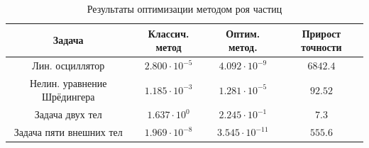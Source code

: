 \begin{table}
	\centering
	\caption{Результаты оптимизации методом роя частиц}
	\label{tab:opt_results}
	\vspace{5mm} 
	\small
	\renewcommand{\arraystretch}{1.5}
	\begin{tabular}{|c|c|c|c|}
		\hline
		\multicolumn{1}{|c|}{\textbf{Задача}} &
		\textbf{Классич. метод} &
		\textbf{Оптим. метод.} &
		\multicolumn{1}{|c|}{\textbf{Прирост точности}} \\ \hline
		
		Лин. осциллятор &
		$2.800 \cdot 10^{-5}$ &
		$4.092 \cdot 10^{-9}$ &
		$6842.4$ \\ \hline 
		
		Нелин. уравнение Шрёдингера &
		$1.185 \cdot 10^{-3}$ &
		$1.281 \cdot 10^{-5}$ &
		$92.52$ \\ \hline
		
		Задача двух тел &
		$1.637 \cdot 10^{0}$ &
		$2.245 \cdot 10^{-1}$ &
		$7.3$ \\ \hline
		
		Задача пяти внешних тел &
		$1.969 \cdot 10^{-8}$ &
		$3.545 \cdot 10^{-11}$ &
		$555.6$ \\ \hline
	\end{tabular}
	\renewcommand{\arraystretch}{1}
\end{table}
